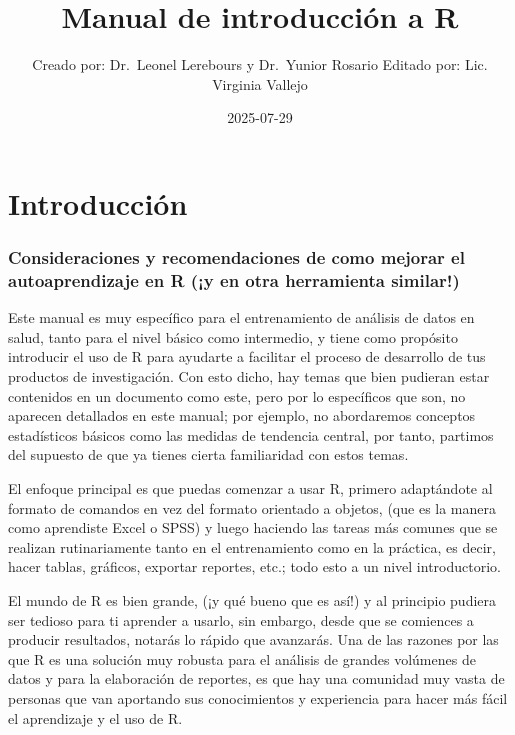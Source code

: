 \documentclass[
  letterpaper,
  DIV=11,
  numbers=noendperiod]{scrreprt}
\title{Manual de introducción a R}
\author{Creado por: Dr.~Leonel Lerebours y Dr.~Yunior Rosario Editado
por: Lic. Virginia Vallejo}
\date{2025-07-29}
\renewcommand*\contentsname{Contenido}
\newcommand\contentsname{Contenido}
\begin{document}
\maketitle

\renewcommand*\contentsname{Contenido}
{
\hypersetup{linkcolor=}
\setcounter{tocdepth}{2}
\tableofcontents
}


\chapter{Introducción}\label{introducciuxf3n}

\subsection{Consideraciones y recomendaciones de como mejorar el
autoaprendizaje en R (¡y en otra herramienta
similar!)}\label{consideraciones-y-recomendaciones-de-como-mejorar-el-autoaprendizaje-en-r-y-en-otra-herramienta-similar}

Este manual es muy específico para el entrenamiento de análisis de datos
en salud, tanto para el nivel básico como intermedio, y tiene como
propósito introducir el uso de R para ayudarte a facilitar el proceso de
desarrollo de tus productos de investigación. Con esto dicho, hay temas
que bien pudieran estar contenidos en un documento como este, pero por
lo específicos que son, no aparecen detallados en este manual; por
ejemplo, no abordaremos conceptos estadísticos básicos como las medidas
de tendencia central, por tanto, partimos del supuesto de que ya tienes
cierta familiaridad con estos temas.

El enfoque principal es que puedas comenzar a usar R, primero
adaptándote al formato de comandos en vez del formato orientado a
objetos, (que es la manera como aprendiste Excel o SPSS) y luego
haciendo las tareas más comunes que se realizan rutinariamente tanto en
el entrenamiento como en la práctica, es decir, hacer tablas, gráficos,
exportar reportes, etc.; todo esto a un nivel introductorio.

El mundo de R es bien grande, (¡y qué bueno que es así!) y al principio
pudiera ser tedioso para ti aprender a usarlo, sin embargo, desde que se
comiences a producir resultados, notarás lo rápido que avanzarás. Una de
las razones por las que R es una solución muy robusta para el análisis
de grandes volúmenes de datos y para la elaboración de reportes, es que
hay una comunidad muy vasta de personas que van aportando sus
conocimientos y experiencia para hacer más fácil el aprendizaje y el uso
de R.
\end{document}

